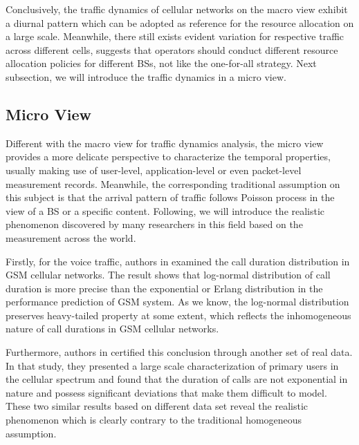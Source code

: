 Conclusively, the traffic dynamics of cellular networks on the macro view exhibit a diurnal pattern which can be adopted as reference for the resource allocation on a large scale. Meanwhile, there still exists evident variation for respective traffic across different cells, suggests that operators should conduct different resource allocation policies for different BSs, not like the one-for-all strategy. Next subsection, we will introduce the traffic dynamics in a micro view.

\subsection*{Micro View}
Different with the macro view for traffic dynamics analysis, the micro view provides a more delicate perspective to characterize the temporal properties, usually making use of user-level, application-level or even packet-level measurement records. Meanwhile, the corresponding traditional assumption on this subject is that the arrival pattern of traffic follows Poisson process in the view of a BS or a specific content. Following, we will introduce the realistic phenomenon discovered by many researchers in this field based on the measurement across the world.

Firstly, for the voice traffic, authors in \cite{guo2007estimate} examined the call duration distribution in GSM cellular networks. The result shows that log-normal distribution of call duration is more precise than the exponential or Erlang distribution in the performance prediction of GSM system. As we know, the log-normal distribution preserves heavy-tailed property at some extent, which reflects the inhomogeneous nature of call durations in GSM cellular networks.

Furthermore, authors in \cite{willkomm2008primary} certified this conclusion through another set of real data. In that study, they presented a large scale characterization of primary users in the cellular spectrum and found that the duration of calls are not exponential in nature and possess significant deviations that make them difficult to model. These two similar results based on different data set reveal the realistic phenomenon which is clearly contrary to the traditional homogeneous assumption.

